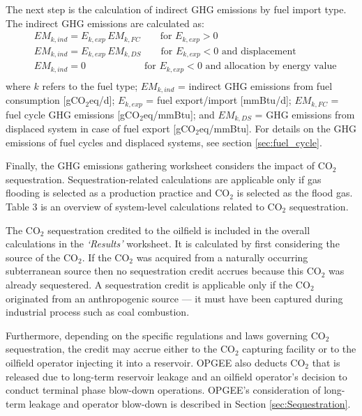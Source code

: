 \documentclass[11pt]{report}
\newcommand{\sheet}[1]{\textit{`{#1}'}}
\begin{document}
The next step is the calculation of indirect GHG emissions by fuel import type. The indirect GHG emissions are calculated as:
\begin{equation}
\begin{split}
& EM_{k,ind} = E_{k,exp} \, EM_{k,FC} \quad\quad \text{for}\,\, E_{k,exp} > 0\\
& EM_{k,ind} = E_{k,exp} \, EM_{k,DS} \quad\quad \text{for}\,\, E_{k,exp} < 0 \,\,\text{and displacement}\\
& EM_{k,ind} = 0 \quad\quad\quad\quad\quad\quad \text{for}\,\, E_{k,exp} < 0 \,\,\text{and allocation by energy value}\\
\end{split}
\end{equation} 
where $k$ refers to the fuel type; $EM_{k,ind}$ = indirect GHG emissions from fuel consumption [gCO$_{2}$eq/d]; $E_{k,exp}$ = fuel export/import [mmBtu/d]; $EM_{k,FC}$ = fuel cycle GHG emissions [gCO$_{2}$eq/mmBtu]; and $EM_{k,DS}$ = GHG emissions from displaced system in case of fuel export [gCO$_{2}$eq/mmBtu]. For details on the GHG emissions of fuel cycles and displaced systems, see section \ref{sec:fuel_cycle}.

Finally, the GHG emissions gathering worksheet considers the impact  of CO$_2$ sequestration. Sequestration-related calculations are applicable only if gas flooding is selected as a production practice and CO$_2$ is selected as the flood gas. Table 3 is an overview of system-level calculations related to CO$_2$ sequestration. 

The CO$_2$ sequestration credited to the oilfield is included in the overall calculations in the \sheet{Results} worksheet. It is calculated by first considering the source of the CO$_2$. If the CO$_2$ was acquired from a naturally occurring subterranean source then no sequestration credit accrues because this CO$_2$ was already sequestered. A sequestration credit is applicable only if the CO$_2$ originated from an anthropogenic source --- it must have been captured during industrial process such as coal combustion. 

Furthermore, depending on the specific regulations and laws governing CO$_2$ sequestration, the credit may accrue either to the CO$_2$ capturing facility or to the oilfield operator injecting it into a reservoir. OPGEE also deducts CO$_2$ that is released due to long-term reservoir leakage and an oilfield operator's decision to conduct terminal phase blow-down operations. OPGEE's consideration of long-term leakage and operator blow-down is described in Section \ref{sec:Sequestration}.
\end{document}
